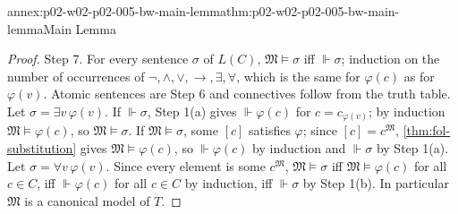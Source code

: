 \begin{annexitem}{annex:p02-w02-p02-005-bw-main-lemma}{thm:p02-w02-p02-005-bw-main-lemma}{Main Lemma}
\begin{proof}
Step 7.  For every sentence \(\sigma\) of \(L(C)\),
\(\mathfrak M\models\sigma\) iff \(\Vdash\sigma\); induction on the number
of occurrences of \(\neg,\land,\lor,\to,\exists,\forall\), which is the
same for \(\varphi(c)\) as for \(\varphi(v)\).  Atomic sentences are Step 6
and connectives follow from the truth table.  Let
\(\sigma=\exists v\,\varphi(v)\).  If \(\Vdash\sigma\), Step 1(a) gives
\(\Vdash\varphi(c)\) for \(c=c_{\varphi(v)}\); by induction
\(\mathfrak M\models\varphi(c)\), so \(\mathfrak M\models\sigma\).  If
\(\mathfrak M\models\sigma\), some \([c]\) satisfies \(\varphi\); since
\([c]=c^{\mathfrak M}\), \cref{thm:fol-substitution} gives
\(\mathfrak M\models\varphi(c)\), so \(\Vdash\varphi(c)\) by induction and
\(\Vdash\sigma\) by Step 1(a).  Let \(\sigma=\forall v\,\varphi(v)\).
Since every element is some \(c^{\mathfrak M}\),
\(\mathfrak M\models\sigma\) iff \(\mathfrak M\models\varphi(c)\) for all
\(c\in C\), iff \(\Vdash\varphi(c)\) for all \(c\in C\) by induction, iff
\(\Vdash\sigma\) by Step 1(b).  In particular \(\mathfrak M\) is a
canonical model of \(T\).
\end{proof}
\end{annexitem}

